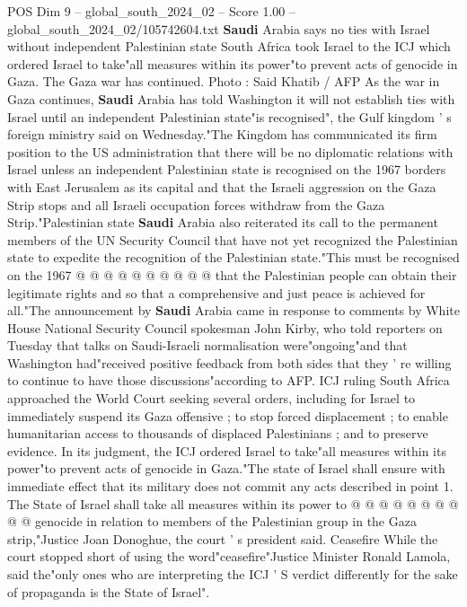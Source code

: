 \begin{textsample}{POS Dim 9 – global\_south\_2024\_02 – Score 1.00 – global\_south\_2024\_02/105742604.txt}  \label{ex:f9_pos_099}
\textbf{Saudi} Arabia says no ties with Israel without independent Palestinian state South Africa took Israel to the ICJ which ordered Israel to take"all measures within its power"to prevent acts of genocide in Gaza.
The Gaza war has continued.
Photo : Said Khatib / AFP As the war in Gaza continues, \textbf{Saudi} Arabia has told Washington it will not establish ties with Israel until an independent Palestinian state"is recognised", the Gulf kingdom ' s foreign ministry said on Wednesday."The Kingdom has communicated its firm position to the US administration that there will be no diplomatic relations with Israel unless an independent Palestinian state is recognised on the 1967 borders with East Jerusalem as its capital and that the Israeli aggression on the Gaza Strip stops and all Israeli occupation forces withdraw from the Gaza Strip."Palestinian state \textbf{Saudi} Arabia also reiterated its call to the permanent members of the UN Security Council that have not yet recognized the Palestinian state to expedite the recognition of the Palestinian state."This must be recognised on the 1967 @ @ @ @ @ @ @ @ @ @ that the Palestinian people can obtain their legitimate rights and so that a comprehensive and just peace is achieved for all."The announcement by \textbf{Saudi} Arabia came in response to comments by White House National Security Council spokesman John Kirby, who told reporters on Tuesday that talks on Saudi-Israeli normalisation were"ongoing"and that Washington had"received positive feedback from both sides that they ' re willing to continue to have those discussions"according to AFP.
ICJ ruling South Africa approached the World Court seeking several orders, including for Israel to immediately suspend its Gaza offensive ; to stop forced displacement ; to enable humanitarian access to thousands of displaced Palestinians ; and to preserve evidence.
In its judgment, the ICJ ordered Israel to take"all measures within its power"to prevent acts of genocide in Gaza."The state of Israel shall ensure with immediate effect that its military does not commit any acts described in point 1.
The State of Israel shall take all measures within its power to @ @ @ @ @ @ @ @ @ @ genocide in relation to members of the Palestinian group in the Gaza strip,"Justice Joan Donoghue, the court ' s president said.
Ceasefire While the court stopped short of using the word"ceasefire"Justice Minister Ronald Lamola, said the"only ones who are interpreting the ICJ ' S verdict differently for the sake of propaganda is the State of Israel".

\end{textsample}
